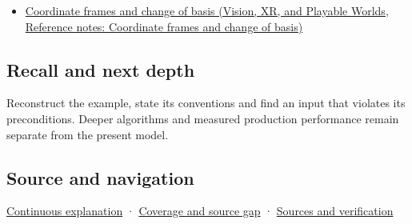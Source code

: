 \begin{itemize}
\tightlist
\item
  \href{../07-Vision-XR-and-Playable-Worlds/main.pdf\#nameddest=appendix-1bae9457dbc3}{Coordinate frames and change of basis (Vision, XR, and Playable Worlds, Reference notes: Coordinate frames and change of basis)}
\end{itemize}

\subsection{Recall and next depth}\label{appendix-48d2e66378ab-recall-and-next-depth}

Reconstruct the example, state its conventions and find an input that violates its preconditions. Deeper algorithms and measured production performance remain separate from the present model.

\subsection{Source and navigation}\label{appendix-48d2e66378ab-source-and-navigation}

\hyperref[01-foundations-i-ch018-keep-the-promises-visible-while-moving-between-representations]{Continuous explanation} · \hyperref[appendix-fd090d982a15-phase-7---parts-601-700]{Coverage and source gap} · \hyperref[appendix-a103e7846d21-phase-7---source-analysis-and-verification]{Sources and verification}
